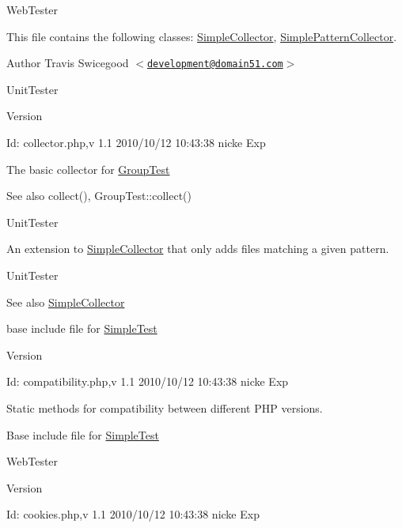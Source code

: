 WebTester

This file contains the following classes: \hyperlink{class_simple_collector}{SimpleCollector}, \hyperlink{class_simple_pattern_collector}{SimplePatternCollector}.

\begin{DoxyAuthor}{Author}
Travis Swicegood $<$\href{mailto:development@domain51.com}{\tt development@domain51.com}$>$
\end{DoxyAuthor}
UnitTester \begin{DoxyVersion}{Version}

\end{DoxyVersion}
\begin{DoxyParagraph}{Id:}
collector.php,v 1.1 2010/10/12 10:43:38 nicke Exp 
\end{DoxyParagraph}


The basic collector for \hyperlink{}{GroupTest}

\begin{DoxySeeAlso}{See also}
collect(), GroupTest::collect()
\end{DoxySeeAlso}
UnitTester

An extension to \hyperlink{class_simple_collector}{SimpleCollector} that only adds files matching a given pattern.

UnitTester \begin{DoxySeeAlso}{See also}
\hyperlink{class_simple_collector}{SimpleCollector}
\end{DoxySeeAlso}
base include file for \hyperlink{class_simple_test}{SimpleTest}

\begin{DoxyVersion}{Version}

\end{DoxyVersion}
\begin{DoxyParagraph}{Id:}
compatibility.php,v 1.1 2010/10/12 10:43:38 nicke Exp 
\end{DoxyParagraph}


Static methods for compatibility between different PHP versions.

Base include file for \hyperlink{class_simple_test}{SimpleTest}

WebTester \begin{DoxyVersion}{Version}

\end{DoxyVersion}
\begin{DoxyParagraph}{Id:}
cookies.php,v 1.1 2010/10/12 10:43:38 nicke Exp 
\end{DoxyParagraph}


